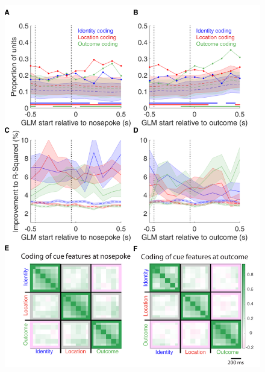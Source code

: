\documentclass[11pt]{article}
\begin{document}
 \begin{figure}[ht!]
\centering
\includegraphics[height=0.7\textheight]{Fig 7 - SUPP GLM.pdf}

\end{figure}
\end{document}
